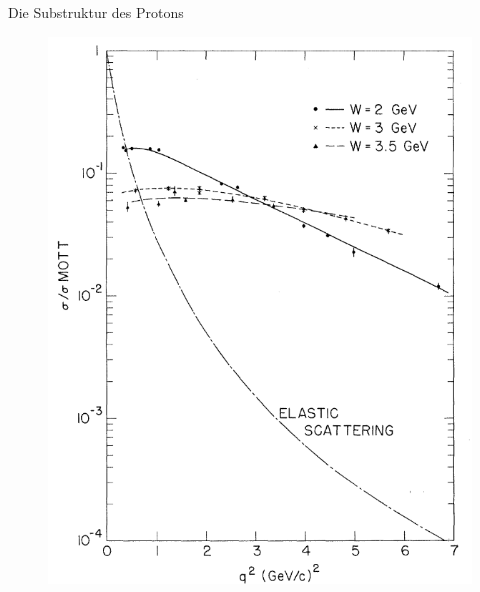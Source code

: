 \documentclass[t,9pt]{beamer}
\newcommand{\highlight}[3]{ \begin{textblock*}{#1}(#2,#3) \begin{tcolorbox} [enhanced,opacityfill=.1,colback=blue] \end{tcolorbox} \end{textblock*} } %
\begin{document}
\begin{frame}{Die Substruktur des Protons}
\begin{minipage}{.5\textwidth}
                \begin{figure}
                        \includegraphics[width=.6\textwidth]{prosi_formfaktor_graph_slac.png}
                        \caption*{\cite{Bloom1969}}
                \end{figure}
                \end{minipage}
        \end{frame}

\end{document}
